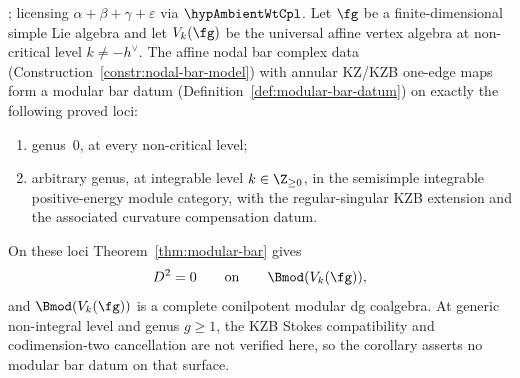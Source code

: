 \begin{corollary}
\ClaimStatusProvedHere; licensing
$\alpha+\beta+\gamma+\varepsilon$ via \(\hypAmbientWtCpl\).
\label{cor:affine-modular-bar-datum}
%
%
Let $\fg$ be a finite-dimensional simple Lie algebra and let
$V_k(\fg)$ be the universal affine vertex algebra at non-critical
level \(k\ne-h^\vee\).  The affine nodal bar complex data
\textup{(}Construction~\textup{\ref{constr:nodal-bar-model}}\textup{)}
with annular KZ\slash KZB one-edge maps form a modular bar datum
\textup{(}Definition~\textup{\ref{def:modular-bar-datum}}\textup{)}
on exactly the following proved loci:
\begin{enumerate}[label=\textup{(\alph*)}]
\item genus~\(0\), at every non-critical level;
\item arbitrary genus, at integrable level \(k\in\Z_{\ge0}\), in the
 semisimple integrable positive-energy module category, with the
 regular-singular KZB extension and the associated curvature
 compensation datum.
\end{enumerate}
On these loci Theorem~\textup{\ref{thm:modular-bar}} gives
\[
D^2=0
\qquad\textup{on}\qquad
\Bmod(V_k(\fg)),
\]
and \(\Bmod(V_k(\fg))\) is a complete conilpotent modular dg
coalgebra.  At generic non-integral level and genus \(g\ge1\), the
KZB Stokes compatibility and codimension-two cancellation are not
verified here, so the corollary asserts no modular bar datum on that
surface.
\end{corollary}

